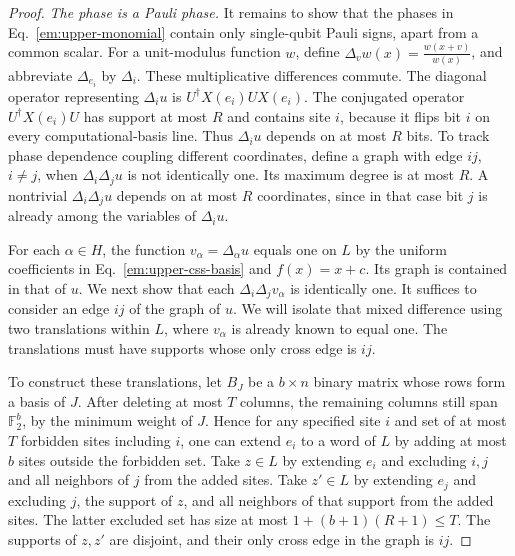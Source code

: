 \documentclass[aps,prl,reprint,notitlepage,nofootinbib,nobibnotes]{revtex4-2}
\begin{document}
\begin{proof}
\emph{The phase is a Pauli phase.}
It remains to show that the phases in Eq.~\eqref{em:upper-monomial} contain only single-qubit Pauli
signs, apart from a common scalar. For a unit-modulus function $w$, define $\Delta_v
w(x)=\frac{w(x+v)}{w(x)}$, and abbreviate $\Delta_{e_i}$ by $\Delta_i$. These multiplicative
differences commute. The diagonal operator representing $\Delta_i u$ is $U^\dagger X(e_i)U X(e_i)$.
The conjugated operator $U^\dagger X(e_i)U$ has support at most $R$ and contains site $i$, because
it flips bit $i$ on every computational-basis line. Thus $\Delta_i u$ depends on at most $R$ bits.
To track phase dependence coupling different coordinates, define a graph with edge $ij$, $i\ne j$,
when $\Delta_i\Delta_j u$ is not identically one. Its maximum degree is at most $R$. A nontrivial
$\Delta_i\Delta_j u$ depends on at most $R$ coordinates, since in that case bit $j$ is already
among the variables of $\Delta_i u$.

For each $\alpha\in H$, the function $v_\alpha=\Delta_\alpha u$ equals one on $L$ by the uniform
coefficients in Eq.~\eqref{em:upper-css-basis} and $f(x)=x+c$. Its graph is contained in that of
$u$. We next show that each $\Delta_i\Delta_j v_\alpha$ is identically one. It suffices to consider
an edge $ij$ of the graph of $u$. We will isolate that mixed difference using two translations
within $L$, where $v_\alpha$ is already known to equal one. The translations must have supports
whose only cross edge is $ij$.

To construct these translations, let $B_J$ be a $b\times n$ binary matrix whose rows form a basis
of $J$. After deleting at most $T$ columns, the remaining columns still span $\mathbb F_2^b$, by
the minimum weight of $J$. Hence for any specified site $i$ and set of at most $T$ forbidden sites
including $i$, one can extend $e_i$ to a word of $L$ by adding at most $b$ sites outside the
forbidden set. Take $z\in L$ by extending $e_i$ and excluding $i,j$ and all neighbors of $j$ from
the added sites. Take $z'\in L$ by extending $e_j$ and excluding $j$, the support of $z$, and all
neighbors of that support from the added sites. The latter excluded set has size at most
$1+(b+1)(R+1)\le T$. The supports of $z,z'$ are disjoint, and their only cross edge in the graph is
$ij$.


\end{proof}
\end{document}
